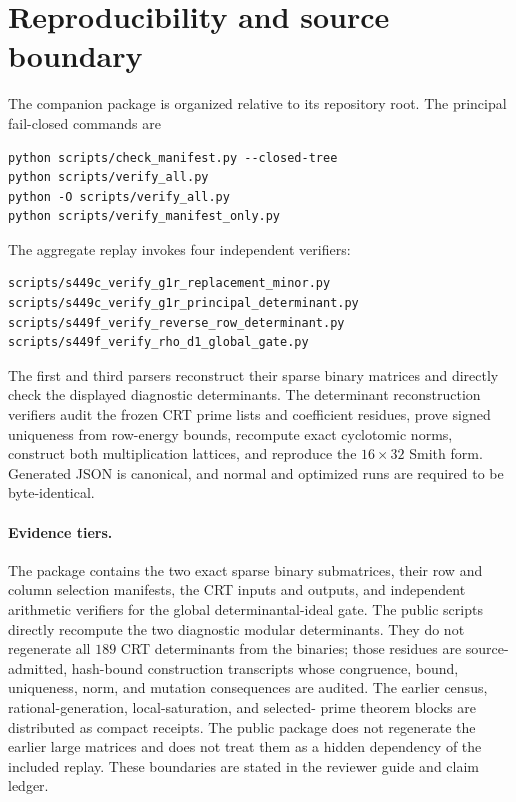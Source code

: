 \section{Reproducibility and source boundary}
\label{app:reproducibility}

The companion package is organized relative to its repository root.  The
principal fail-closed commands are
\begin{verbatim}
python scripts/check_manifest.py --closed-tree
python scripts/verify_all.py
python -O scripts/verify_all.py
python scripts/verify_manifest_only.py
\end{verbatim}
The aggregate replay invokes four independent verifiers:
\begin{verbatim}
scripts/s449c_verify_g1r_replacement_minor.py
scripts/s449c_verify_g1r_principal_determinant.py
scripts/s449f_verify_reverse_row_determinant.py
scripts/s449f_verify_rho_d1_global_gate.py
\end{verbatim}
The first and third parsers reconstruct their sparse binary matrices and
directly check the displayed diagnostic determinants.  The determinant
reconstruction verifiers audit the frozen CRT prime lists and coefficient
residues, prove signed uniqueness from row-energy bounds, recompute exact
cyclotomic norms, construct both multiplication lattices, and reproduce
the \(16\times32\) Smith form.  Generated JSON is canonical, and normal
and optimized runs are required to be byte-identical.

\paragraph{Evidence tiers.}
The package contains the two exact sparse binary submatrices, their row
and column selection manifests, the CRT inputs and outputs, and independent
arithmetic verifiers for the global determinantal-ideal gate.  The public
scripts directly recompute the two diagnostic modular determinants.  They
do not regenerate all \(189\) CRT determinants from the binaries; those
residues are source-admitted, hash-bound construction transcripts whose
congruence, bound, uniqueness, norm, and mutation consequences are audited.
The earlier census, rational-generation, local-saturation, and selected-
prime theorem blocks are distributed as compact receipts.  The public package
does not regenerate the earlier large matrices and does not treat them as a
hidden dependency of the included replay.  These boundaries are stated in the
reviewer guide and claim ledger.

